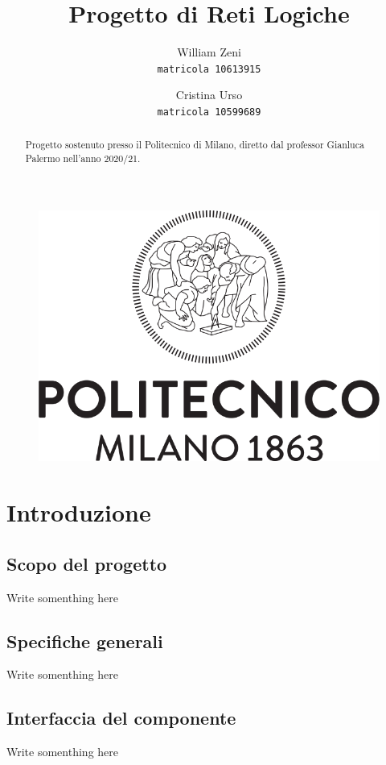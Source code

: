 \documentclass{article}
\title{Progetto di Reti Logiche}
\author{
  William Zeni\\
  \texttt{matricola 10613915}
  \and
  Cristina Urso\\
  \texttt{matricola 10599689}
}
\begin{document}
\maketitle

\renewcommand{\abstractname}{ }
\begin{abstract}
  \centering
  Progetto sostenuto presso il Politecnico di Milano, diretto dal professor Gianluca Palermo nell'anno 2020/21.
\end{abstract}

\begin{figure}[b]
  \centering
  \includegraphics[scale=0.4]{Logo_Politecnico_Milano.png}
\end{figure}


\pagebreak
\tableofcontents
\pagebreak


\section{Introduzione} %
\subsection{Scopo del progetto} %
Write somenthing here

\subsection{Specifiche generali} %
Write somenthing here

\subsection{Interfaccia del componente} %
Write somenthing here
\end{document}
